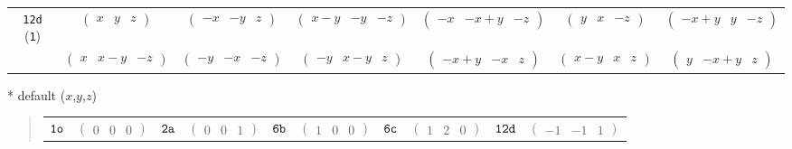 \documentclass[fleqn,9pt,landscape]{jsarticle}
\begin{document}
\begin{center}
\begin{longtable}{ccccccc}
{\tt 12d} ({\tt 1}) & $ \begin{pmatrix} x & y & z \end{pmatrix} $ & $ \begin{pmatrix} - x & - y & z \end{pmatrix} $ & $ \begin{pmatrix} x - y & - y & - z \end{pmatrix} $ & $ \begin{pmatrix} - x & - x + y & - z \end{pmatrix} $ & $ \begin{pmatrix} y & x & - z \end{pmatrix} $ & $ \begin{pmatrix} - x + y & y & - z \end{pmatrix} $ \\
& $ \begin{pmatrix} x & x - y & - z \end{pmatrix} $ & $ \begin{pmatrix} - y & - x & - z \end{pmatrix} $ & $ \begin{pmatrix} - y & x - y & z \end{pmatrix} $ & $ \begin{pmatrix} - x + y & - x & z \end{pmatrix} $ & $ \begin{pmatrix} x - y & x & z \end{pmatrix} $ & $ \begin{pmatrix} y & - x + y & z \end{pmatrix} $ \\
\end{longtable}
\end{center}
* default ($x$,$y$,$z$)
\begin{quote}
\begin{tabular}{cccccccccc}
$ {\tt 1o} $ & $ \begin{pmatrix} 0 & 0 & 0 \end{pmatrix} $ & $ {\tt 2a} $ & $ \begin{pmatrix} 0 & 0 & 1 \end{pmatrix} $ & $ {\tt 6b} $ & $ \begin{pmatrix} 1 & 0 & 0 \end{pmatrix} $ & $ {\tt 6c} $ & $ \begin{pmatrix} 1 & 2 & 0 \end{pmatrix} $ & $ {\tt 12d} $ & $ \begin{pmatrix} -1 & -1 & 1 \end{pmatrix} $
\end{tabular}
\end{quote}
\end{document}
